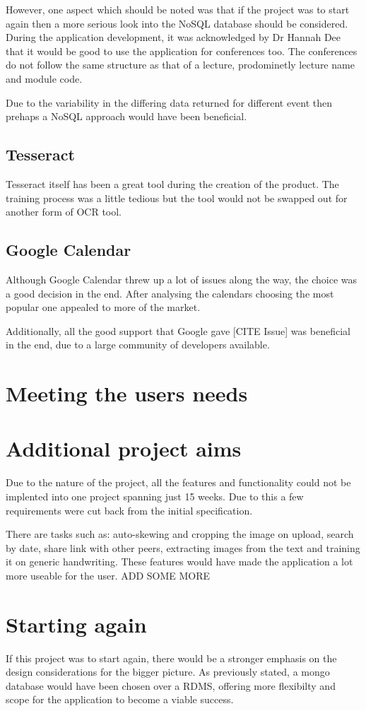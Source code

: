 However, one aspect which should be noted was that if the project was to start again then a more serious look into the NoSQL database should be considered. During the application development, it was acknowledged by Dr Hannah Dee that it would be good to use the application for conferences too. The conferences do not follow the same structure as that of a lecture, prodominetly lecture name and module code.

Due to the variability in the differing data returned for different event then prehaps a NoSQL approach would have been beneficial.

\subsection{Tesseract}
Tesseract itself has been a great tool during the creation of the product. The training process was a little tedious but the tool would not be swapped out for another form of OCR tool.

\subsection{Google Calendar}
Although Google Calendar threw up a lot of issues along the way, the choice was a good decision in the end. After analysing the calendars choosing the most popular one appealed to more of the market.

Additionally, all the good support that Google gave [CITE Issue] was beneficial in the end, due to a large community of developers available.
\section{Meeting the users needs}
\section{Additional project aims}
Due to the nature of the project, all the features and functionality could not be implented into one project spanning just 15 weeks. Due to this a few requirements were cut back from the initial specification.

There are tasks such as: auto-skewing and cropping the image on upload, search by date, share link with other peers, extracting images from the text and training it on generic handwriting.  These features would have made the application a lot more useable for the user.
ADD SOME MORE
\section{Starting again}
If this project was to start again, there would be a stronger emphasis on the design considerations for the bigger picture. As previously stated, a mongo database would have been chosen over a RDMS, offering more flexibilty and scope for the application to become a viable success.
